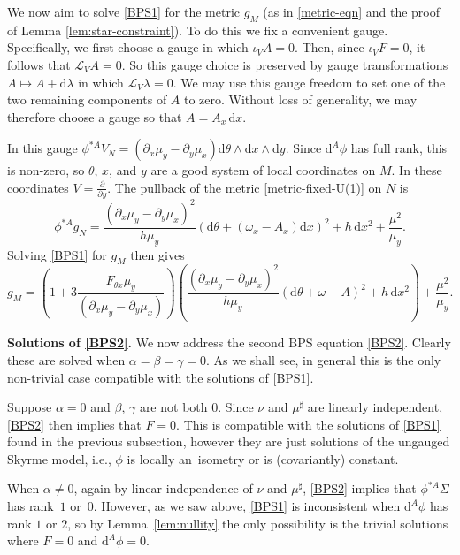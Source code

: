 \documentclass[10pt,a4paper]{amsart}
\newcommand{\1}{{\mathbb{1}}}
\def \d{\mathrm{d}}
\numberwithin{equation}{section}
\begin{document}
We now aim to solve \eqref{BPS1} for the metric $g_M$ (as in \eqref{metric-eqn} and the proof of Lemma \ref{lem:star-constraint}). To do this we fix a convenient gauge. Specifically, we first choose a gauge in which $\iota_V A=0$. Then, since $\iota_VF = 0$, it follows that $\mathcal{L}_VA=0$. So this gauge choice is preserved by gauge transformations $A\mapsto A+\d\lambda$ in which $\mathcal{L}_V\lambda=0$. We may use this gauge freedom to set one of the two remaining components of $A$ to zero. Without loss of generality, we may therefore choose a gauge so that $A=A_x\,\d x$.

In this gauge $\phi^{\ast A} V_N=(\partial_x\mu_y-\partial_y\mu_x)\d\theta\wedge \d x\wedge \d y$. Since $\d^A\phi$ has full rank, this is non-zero, so $\theta$, $x$, and $y$ are a good system of local coordinates on $M$. In these coordinates $V=\frac{\partial}{\partial y}$. The pullback of the metric \eqref{metric-fixed-U(1)} on $N$ is
\begin{equation*}
\phi^{\ast A}g_N = \frac{(\partial_x\mu_y-\partial_y\mu_x)^2}{h\mu_y}(\d\theta+(\omega_x-A_x)\d x)^2 + h\,\d x^2 + \frac{\mu^2}{\mu_y}.
\end{equation*}
Solving \eqref{BPS1} for $g_M$ then gives
\begin{equation}\label{metric-sol-U1}
g_M = \left(1+3\frac{F_{\theta x}\mu_y}{(\partial_x\mu_y-\partial_y\mu_x)}\right)\left(\frac{(\partial_x\mu_y-\partial_y\mu_x)^2}{h\mu_y}(\d\theta+\omega-A)^2 + h\,\d x^2\right) + \frac{\mu^2}{\mu_y}.
\end{equation}

{\bf Solutions of \eqref{BPS2}.} We now address the second BPS equation \eqref{BPS2}. Clearly these are solved when $\alpha=\beta=\gamma=0$. As we shall see, in general this is the only non-trivial case compatible with the solutions of \eqref{BPS1}.

Suppose $\alpha=0$ and $\beta$, $\gamma$ are not both $0$. Since $\nu$ and $\mu^\sharp$ are linearly independent, \eqref{BPS2} then implies that $F=0$. This is compatible with the solutions of \eqref{BPS1} found in the previous subsection, however they are just solutions of the ungauged Skyrme model, i.e., $\phi$ is locally an~isometry or is (covariantly) constant.

When $\alpha\neq0$, again by linear-independence of $\nu$ and $\mu^\sharp$, \eqref{BPS2} implies that $\phi^{\ast A}\Sigma$ has rank~$1$ or~$0$. However, as we saw above, \eqref{BPS1} is inconsistent when $\d^A\phi$ has rank $1$ or $2$, so by Lemma~\ref{lem:nullity} the only possibility is the trivial solutions where $F=0$ and $\d^A\phi=0$.
\end{document}
